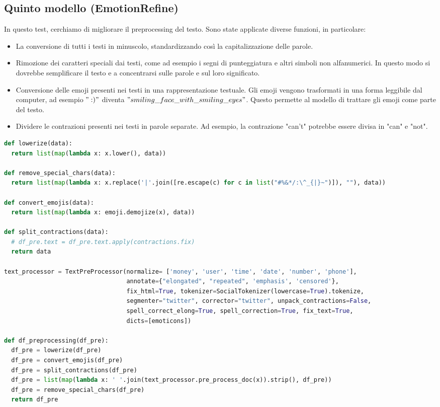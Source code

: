 \documentclass{article}
\begin{document}
\subsection{Quinto modello (EmotionRefine)}
In questo test, cerchiamo di migliorare il preprocessing del testo. Sono state applicate diverse funzioni, in particolare:
\begin{itemize}
    \item La conversione di tutti i testi in minuscolo, standardizzando così la capitalizzazione delle parole.
    \item Rimozione dei caratteri speciali dai testi, come ad esempio i segni di punteggiatura e altri simboli non alfanumerici. In questo modo si dovrebbe semplificare il testo e a concentrarsi sulle parole e sul loro significato.
    \item Conversione delle emoji presenti nei testi in una rappresentazione testuale. Gli emoji vengono trasformati in una forma leggibile dal computer, ad esempio $":)"$ diventa $"smiling\_face\_with\_smiling\_eyes"$. Questo permette al modello di trattare gli emoji come parte del testo.
    \item Dividere le contrazioni presenti nei testi in parole separate. Ad esempio, la contrazione "can't" potrebbe essere divisa in "can" e "not".
\end{itemize}

\begin{lstlisting}[language=Python, caption=Distribuzione emozioni]
def lowerize(data):
  return list(map(lambda x: x.lower(), data))

def remove_special_chars(data):
  return list(map(lambda x: x.replace('|'.join([re.escape(c) for c in list("#%&*/:\^_{|}~")]), ""), data))

def convert_emojis(data):
  return list(map(lambda x: emoji.demojize(x), data))

def split_contractions(data):
  # df_pre.text = df_pre.text.apply(contractions.fix)
  return data

text_processor = TextPreProcessor(normalize= ['money', 'user', 'time', 'date', 'number', 'phone'],
                                  annotate={"elongated", "repeated", 'emphasis', 'censored'},
                                  fix_html=True, tokenizer=SocialTokenizer(lowercase=True).tokenize,
                                  segmenter="twitter", corrector="twitter", unpack_contractions=False,
                                  spell_correct_elong=True, spell_correction=True, fix_text=True,
                                  dicts=[emoticons])

def df_preprocessing(df_pre):
  df_pre = lowerize(df_pre)
  df_pre = convert_emojis(df_pre)
  df_pre = split_contractions(df_pre)
  df_pre = list(map(lambda x: ' '.join(text_processor.pre_process_doc(x)).strip(), df_pre))
  df_pre = remove_special_chars(df_pre)
  return df_pre
\end{lstlisting}
\end{document}
